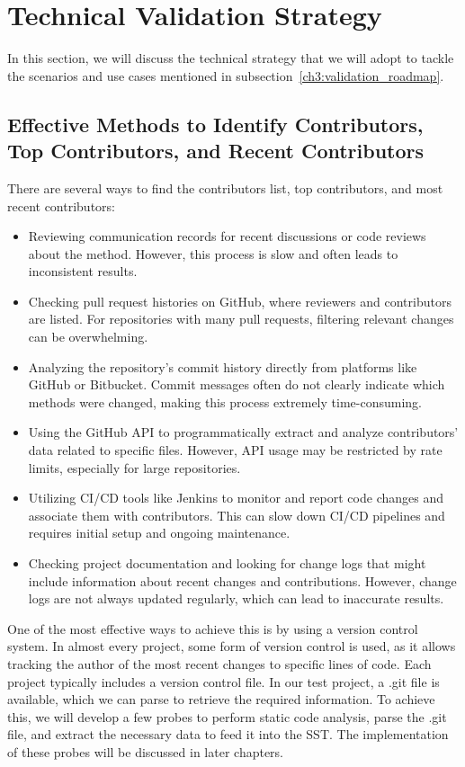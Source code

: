 \section{Technical Validation Strategy}\label{ch3-sec:technical_validation_strategy}

In this section, we will discuss the technical strategy that we will adopt to tackle the scenarios and use cases mentioned in subsection~\ref{ch3:validation_roadmap}.

\subsection{Effective Methods to Identify Contributors, Top Contributors, and Recent Contributors}

There are several ways to find the contributors list, top contributors, and most recent contributors:
\begin{itemize}
    \item Reviewing communication records for recent discussions or code reviews about the method. However, this process is slow and often leads to inconsistent results.
    \item Checking pull request histories on GitHub, where reviewers and contributors are listed. For repositories with many pull requests, filtering relevant changes can be overwhelming.
    \item Analyzing the repository's commit history directly from platforms like GitHub or Bitbucket. Commit messages often do not clearly indicate which methods were changed, making this process extremely time-consuming.
    \item Using the GitHub API to programmatically extract and analyze contributors' data related to specific files. However, API usage may be restricted by rate limits, especially for large repositories.
    \item Utilizing CI/CD tools like Jenkins to monitor and report code changes and associate them with contributors. This can slow down CI/CD pipelines and requires initial setup and ongoing maintenance.
    \item Checking project documentation and looking for change logs that might include information about recent changes and contributions. However, change logs are not always updated regularly, which can lead to inaccurate results.
\end{itemize}

One of the most effective ways to achieve this is by using a version control system. In almost every project, some form of version control is used, as it allows tracking the author of the most recent changes to specific lines of code. Each project typically includes a version control file. In our test project, a .git file is available, which we can parse to retrieve the required information. To achieve this, we will develop a few probes to perform static code analysis, parse the .git file, and extract the necessary data to feed it into the SST. The implementation of these probes will be discussed in later chapters.

